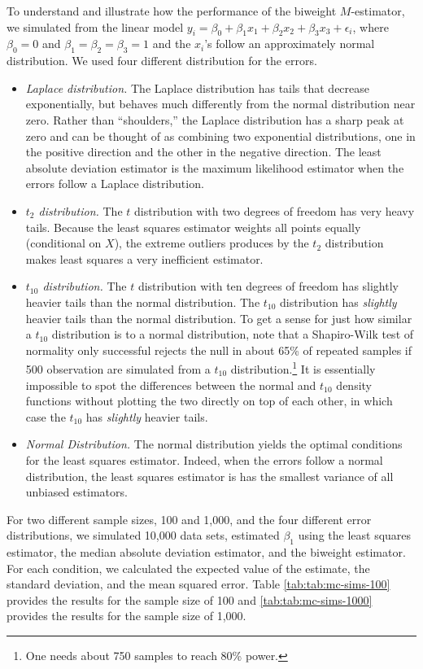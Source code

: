\documentclass[10pt]{article}
\begin{document}
To understand and illustrate how the performance of the biweight $M$-estimator, we simulated from the linear model $y_i = \beta_0 + \beta_1x_1 + \beta_2 x_2 + \beta_3 x_3 + \epsilon_i$, where $\beta_0 = 0$ and $\beta_1 = \beta_2 = \beta_3 = 1$ and the $x_i$'s follow an approximately normal distribution. We used four different distribution for the errors.
\begin{itemize}
\item \textit{Laplace distribution.} The Laplace distribution has tails that decrease exponentially, but behaves much differently from the normal distribution near zero. Rather than ``shoulders,'' the Laplace distribution has a sharp peak at zero and can be thought of as combining two exponential distributions, one in the positive direction and the other in the negative direction. The least absolute deviation estimator is the maximum likelihood estimator when the errors follow a Laplace distribution.
\item \textit{$t_2$ distribution.} The $t$ distribution with two degrees of freedom has very heavy tails. Because the least squares estimator weights all points equally (conditional on $X$), the extreme outliers produces by the $t_2$ distribution makes least squares a very inefficient estimator.
\item \textit{$t_{10}$ distribution.} The $t$ distribution with ten degrees of freedom has slightly heavier tails than the normal distribution. The $t_10$ distribution has \textit{slightly} heavier tails than the normal distribution. To get a sense for just how similar a $t_{10}$ distribution is to a normal distribution, note that a Shapiro-Wilk test of normality only successful rejects the null in about 65\% of repeated samples if 500 observation are simulated from a $t_{10}$ distribution.\footnote{One needs about 750 samples to reach 80\% power.} It is essentially impossible to spot the differences between the normal and $t_{10}$ density functions without plotting the two directly on top of each other, in which case the $t_{10}$ has \textit{slightly} heavier tails.
\item \textit{Normal Distribution.} The normal distribution yields the optimal conditions for the least squares estimator. Indeed, when the errors follow a normal distribution, the least squares estimator is has the smallest variance of all unbiased estimators. 
\end{itemize}

For two different sample sizes, 100 and 1,000, and the four different error distributions, we simulated 10,000 data sets, estimated $\beta_1$ using the least squares estimator, the median absolute deviation estimator, and the biweight estimator. For each condition, we calculated the expected value of the estimate, the standard deviation, and the mean squared error. Table \ref{tab:tab:mc-sims-100} provides the results for the sample size of 100 and \ref{tab:tab:mc-sims-1000} provides the results for the sample size of 1,000. 
\end{document}

